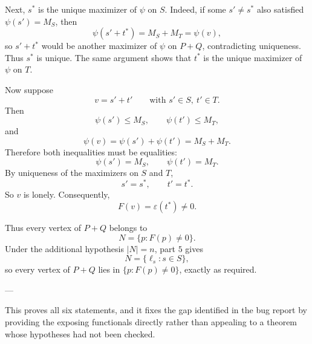 Next, \(s^\ast\) is the unique maximizer of \(\psi\) on \(S\). Indeed, if some \(s'\neq s^\ast\) also satisfied \(\psi(s')=M_S\), then
\[
\psi(s'+t^\ast)=M_S+M_T=\psi(v),
\]
so \(s'+t^\ast\) would be another maximizer of \(\psi\) on \(P+Q\), contradicting uniqueness. Thus \(s^\ast\) is unique. The same argument shows that \(t^\ast\) is the unique maximizer of \(\psi\) on \(T\).

Now suppose
\[
v=s'+t'
\qquad\text{with }s'\in S,\ t'\in T.
\]
Then
\[
\psi(s')\le M_S,\qquad \psi(t')\le M_T,
\]
and
\[
\psi(v)=\psi(s')+\psi(t')=M_S+M_T.
\]
Therefore both inequalities must be equalities:
\[
\psi(s')=M_S,\qquad \psi(t')=M_T.
\]
By uniqueness of the maximizers on \(S\) and \(T\),
\[
s'=s^\ast,\qquad t'=t^\ast.
\]
So \(v\) is lonely. Consequently,
\[
F(v)=\varepsilon(t^\ast)\neq 0.
\]

Thus every vertex of \(P+Q\) belongs to
\[
N=\{p:F(p)\neq 0\}.
\]
Under the additional hypothesis \(|N|=n\), part \(5\) gives
\[
N=\{\ell_s:s\in S\},
\]
so every vertex of \(P+Q\) lies in \(\{p:F(p)\neq 0\}\), exactly as required.

---

This proves all six statements, and it fixes the gap identified in the bug report by providing the exposing functionals directly rather than appealing to a theorem whose hypotheses had not been checked.